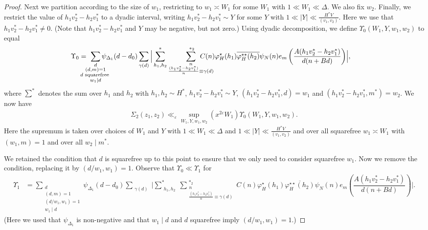 \documentclass{amsart}
\numberwithin{equation}{section}
\begin{document}
\begin{proof}
\vspace{3mm} 
Next we partition according to the size of $w_1$, restricting to $w_1 \asymp W_1$ for some $W_1$ with $1 \ll W_1 \ll \Delta$. We also fix $w_2$. Finally, we  restrict the value of $h_1v_2^*-h_2v_1^*$ to a dyadic interval, writing $h_1v_2^*-h_2v_1^* \sim Y$ for some $Y$ with $1 \ll |Y| \ll \frac{H^*V}{(v_1,v_2)}$. Here we use that $h_1 v_2^* -h_2 v_1^*\neq 0$. (Note that  $h_1v_2^*-h_2v_1^*$ and $Y$ may be negative, but not zero.) Using dyadic decomposition, we define $\Upsilon_0(W_1,Y,w_1,w_2)$ to equal
\begin{align*}
\Upsilon_0
&=\!\!\!\!\!\!\!
\sum_{\substack{d  \\(d,m)=1 \\ d \mbox{\begin{scriptsize}
squarefree
\end{scriptsize}} \\ w_1 \mid d
}} \!\!\!\!\!\!\!\!\!\psi_{\Delta_1}(d-d_0) \sum_{\substack{\gamma (d) }} \Big| \sum_{\substack{h_1, h_2  }}^*\sum_{\substack{n \\\frac{(h_1v_2^*-h_2v_1^*)}{n} \equiv \gamma(d) }}^{\,\,*_2} \!\!\!\!\!\!\!\!\!\!\!\!\!C(n) \varphi^\star_H(h_1) \overline{\varphi^{\star\star}_H(h_2)}\psi_N(n)  e_{m}\left(\dfrac{A (h_1v_2^*-h_2v_1^*) }{d(n+B d)}\right)\! \Big|,
\end{align*}
where  $\sum\limits^*$ denotes the sum over $h_1$ and $h_2$ with $h_1, h_2 \sim H^*$, $h_1v_2^* - h_2 v_1^* \sim Y$,   $(h_1v_2^*-h_2v_1^*,d)=w_1$ and $(h_1v_2^*-h_2v_1^*,m^*)=w_2$.  We now have
\begin{align*}
\Sigma_2(z_1,z_2) \ll_\varepsilon \sup_{W_1,Y,w_1,w_2} (x^{2\varepsilon} W_1) \Upsilon_0(W_1,Y,w_1,w_2).
\end{align*}
Here the supremum is taken over choices of $W_1$ and $Y$ with  $1 \ll W_1 \ll \Delta$ and $1 \ll |Y| \ll \frac{H^* V}{(v_1,v_2)}$ and over  all squarefree $w_1 \asymp W_1$ with $(w_1,m)=1$ and over all $w_2 \mid m^*$.



 
\vspace{3mm} We retained the condition that $d$  is squarefree up to this point to ensure that we only need to consider squarefree $w_1$. Now we remove the condition, replacing it by $(d/w_1,w_1)=1$. Observe that $\Upsilon_0 \ll \Upsilon_1$ for 
\begin{align*}
\Upsilon_1
&=\!\!\!\!\!\!\!\!\!\!
\sum_{\substack{d  \\(d,m)=1 \\ (d/w_1,w_1)=1 \\ w_1 \mid d
}} \!\!\!\!\!\!\!\psi_{\Delta_1}(d-d_0) \sum_{\substack{\gamma (d) }} \Big| \sum_{\substack{h_1, h_2 }}^* \sum_{\substack{n \\\frac{(h_1v_2^*-h_2v_1^*)}{n} \equiv \gamma(d) }}^{\,\,*_2} \!\!\!\!\!\!\!\!\!\!\!\!\!C(n)\varphi^\star_H(h_1) \overline{\varphi^{\star\star}_H(h_2)}\psi_N(n)   e_{m}\left(\dfrac{A (h_1v_2^*-h_2v_1^*) }{d(n+B d)}\right) \Big|.
\end{align*}
(Here we used that $\psi_{\Delta_1}$ is non-negative and that $w_1 \mid d$ and $d$ squarefree imply $(d/w_1,w_1)=1$.) 




\end{proof}
\end{document}
